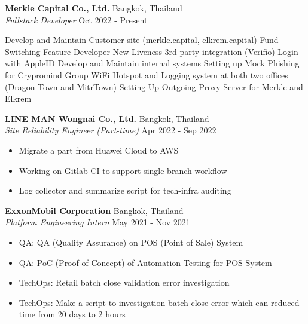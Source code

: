 \textbf{Merkle Capital Co., Ltd.} \hfill Bangkok, Thailand\\
\textit{Fullstack Developer} \hfill Oct 2022 - Present\\
\vspace{-1mm}
\begin{outline}
	\1 Develop and Maintain Customer site (merkle.capital, elkrem.capital)
		\2 Fund Switching Feature Developer
		\2 New Liveness 3rd party integration (Verifio)
		\2 Login with AppleID
	\1 Develop and Maintain internal systems
		\2 Setting up Mock Phishing for Crypromind Group
		\2 WiFi Hotspot and Logging system at both two offices (Dragon Town and MitrTown)
		\2 Setting Up Outgoing Proxy Server for Merkle and Elkrem
\end{outline}
\textbf{LINE MAN Wongnai Co., Ltd.} \hfill Bangkok, Thailand\\
\textit{Site Reliability Engineer (Part-time)} \hfill Apr 2022 - Sep 2022\\
\vspace{-1mm}
\begin{itemize}
	\item Migrate a part from Huawei Cloud to AWS
	\item Working on Gitlab CI to support single branch workflow
	\item Log collector and summarize script for tech-infra auditing
\end{itemize}
\textbf{ExxonMobil Corporation} \hfill Bangkok, Thailand\\
\textit{Platform Engineering Intern} \hfill May 2021 - Nov 2021\\
\vspace{-1mm}
\begin{itemize}
	\item QA: QA (Quality Assurance) on POS (Point of Sale) System
	\item QA: PoC (Proof of Concept) of Automation Testing for POS System
	\item TechOps: Retail batch close validation error investigation
	\item TechOps: Make a script to investigation batch close error which can reduced time from 20 days to 2 hours
\end{itemize}


